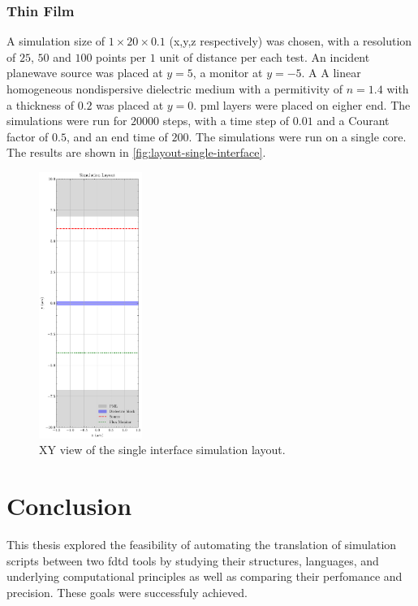 \subsection{Thin Film}
A simulation size of $1 \times 20 \times 0.1$ (x,y,z respectively) was chosen, with a resolution of $25$, $50$ and $100$ points per $1$ unit of distance per each test. An incident planewave source was placed at $y=5$, a monitor at $y=-5$. A A linear homogeneous nondispersive dielectric medium with a permitivity of $n=1.4$ with a thickness of $0.2$ was placed at $y=0$. \gls{pml} layers were placed on eigher end. The simulations were run for $20000$ steps, with a time step of $0.01$ and a Courant factor of $0.5$, and an end time of $200$. The simulations were run on a single core. The results are shown in \cref{fig:layout-single-interface}.
\begin{figure}[H]\label{fig:layout-double-interface}
  \centering
  \includegraphics[width=0.3\textwidth]{obrazky-figures/sim-layout-di.pdf}
  \caption{XY view of the single interface simulation layout.}
\end{figure}




\chapter{Conclusion}\label{chap:conclusion}
This thesis explored the feasibility of automating the translation of simulation scripts between two \gls{fdtd} tools by studying their structures, languages, and underlying computational principles as well as comparing their perfomance and precision. These goals were successfuly achieved. 


